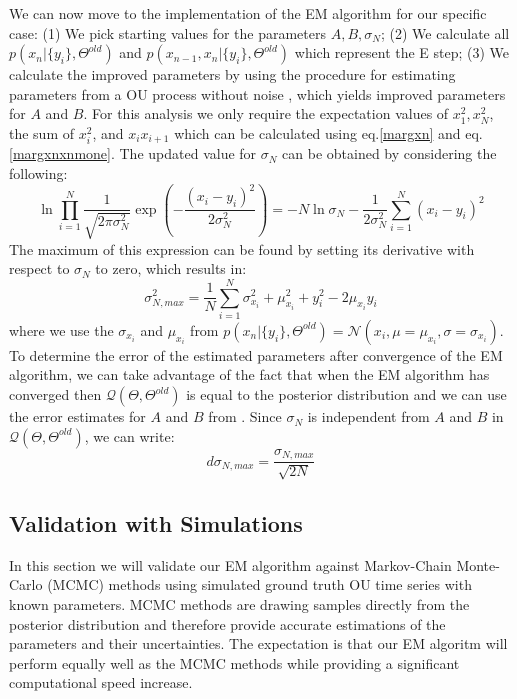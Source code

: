 \documentclass[%
 reprint,
 amsmath,amssymb,
 aps,
]{revtex4-1}
\begin{document}
We can now move to the implementation of the EM algorithm for our specific case: (1) We pick starting values for the parameters ${A,B,\sigma_N}$; (2) We calculate all $p\left( x_{n}|\{y_{i}\},\Theta^{old}\right)$ and $p\left( x_{n-1},x_{n}|\{y_{i}\},\Theta^{old}\right)$ which represent the E step; (3) We calculate the improved parameters by using the procedure for estimating parameters from a OU process without noise \cite{RN91}, which yields improved parameters for $A$ and $B$.  For this analysis we only require the expectation values of $x_{1}^{2},x_{N}^2$, the sum of $x_{i}^2$, and $x_{i}x_{i+1}$ which can be calculated using eq.\ref{margxn} and eq.\ref{margxnxnmone}.  The updated value for $\sigma_{N}$ can be obtained by considering the following:
\begin{equation}
	\ln \prod_{i=1}^{N}\frac{1}{\sqrt{2\pi\sigma_{N}^{2}}}\exp\left(-\frac{(x_{i}-y_{i})^2}{2\sigma_{N}^{2}}\right)=-N\ln\sigma_{N}-\frac{1}{2\sigma_{N}^2}\sum_{i=1}^{N}(x_{i}-y_{i})^2
\end{equation}
The maximum of this expression can be found by setting its derivative with respect to $\sigma_N$ to zero, which results in:
\begin{equation}
	\sigma_{N, max}^{2} = \frac{1}{N}\sum_{i=1}^{N}\sigma_{x_{i}}^{2}+\mu_{x_{i}}^{2}+y_{i}^{2}-2\mu_{x_{i}}y_{i}
\end{equation}
where we use the $\sigma_{x_{i}}$ and $\mu_{x_{i}}$ from $p\left( x_{n}|\{y_{i}\},\Theta^{old}\right)=\mathcal{N}(x_{i},\mu=\mu_{x_{i}},\sigma=\sigma_{x_{i}})$.\\
To determine the error of the estimated parameters after convergence of the EM algorithm, we can take advantage of the fact that when the EM algorithm has converged then $\mathcal{Q}(\Theta,\Theta^{old})$ is equal to the posterior distribution \cite{RN90} and we can use the error estimates for $A$ and $B$ from \cite{RN91}. Since $\sigma_{N}$ is independent from $A$ and $B$ in $\mathcal{Q}(\Theta,\Theta^{old})$, we can write:
\begin{equation}
	d\sigma_{N,max} = \frac{\sigma_{N, max}}{\sqrt{2N}}
\end{equation}
\subsection{Validation with Simulations}
In this section we will validate our EM algorithm against Markov-Chain Monte-Carlo (MCMC) methods using simulated ground truth OU time series with known parameters. MCMC methods are drawing samples directly from the posterior distribution and therefore provide accurate estimations of the parameters and their uncertainties.  The expectation is that our EM algoritm will perform equally well as the MCMC methods while providing a significant computational speed increase.
\end{document}
